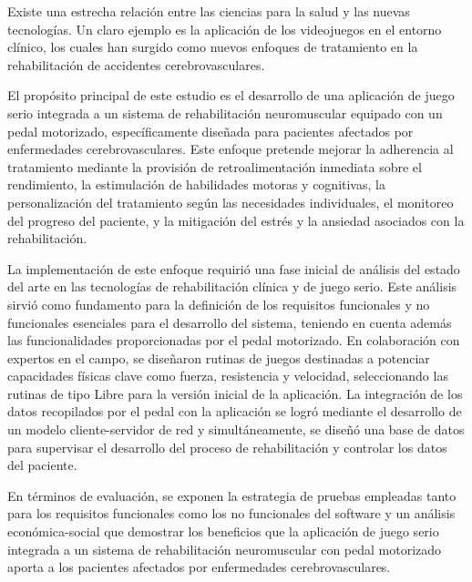 \begin{resumen}
Existe una estrecha relación entre las ciencias para la salud y las nuevas tecnologías. Un claro ejemplo es la aplicación de los videojuegos en el entorno clínico, los cuales han surgido como nuevos enfoques de tratamiento en la rehabilitación de accidentes cerebrovasculares. 

El propósito principal de este estudio es el desarrollo de una aplicación de juego serio integrada a un sistema de rehabilitación neuromuscular equipado con un pedal motorizado, específicamente diseñada para pacientes afectados por enfermedades cerebrovasculares. Este enfoque pretende mejorar la adherencia al tratamiento mediante la provisión de retroalimentación inmediata sobre el rendimiento, la estimulación de habilidades motoras y cognitivas, la personalización del tratamiento según las necesidades individuales, el monitoreo del progreso del paciente, y la mitigación del estrés y la ansiedad asociados con la rehabilitación.

La implementación de este enfoque requirió una fase inicial de análisis del estado del arte en las tecnologías de rehabilitación clínica y de juego serio. Este análisis sirvió como fundamento para la definición de los requisitos funcionales y no funcionales esenciales para el desarrollo del sistema, teniendo en cuenta además las funcionalidades proporcionadas por el pedal motorizado. En colaboración con expertos en el campo, se diseñaron rutinas de juegos destinadas a potenciar capacidades físicas clave como fuerza, resistencia y velocidad, seleccionando las rutinas de tipo Libre para la versión inicial de la aplicación. La integración de los datos recopilados por el pedal con la aplicación se logró mediante el desarrollo de un modelo cliente-servidor de red y simultáneamente, se diseñó una base de datos para supervisar el desarrollo del proceso de rehabilitación y controlar los datos del paciente.

En términos de evaluación, se exponen la estrategia de pruebas empleadas tanto para los requisitos funcionales como los no funcionales del software y un análisis económica-social que demostrar los beneficios que la aplicación de juego serio integrada a un sistema de rehabilitación neuromuscular con pedal motorizado aporta a los pacientes afectados por enfermedades cerebrovasculares.
\end{resumen}
